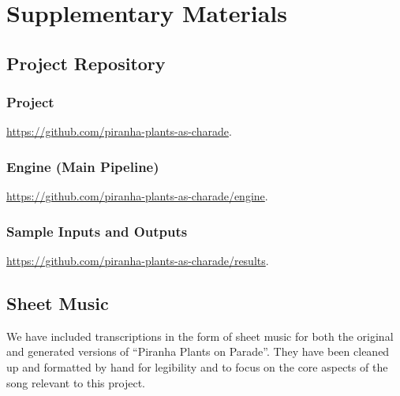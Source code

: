 \section{Supplementary Materials}
\label{sec:supplementary}

\subsection{Project Repository}
\label{sec:code}

\subsubsection{Project} \url{https://github.com/piranha-plants-as-charade}.
\subsubsection{Engine (Main Pipeline)} \url{https://github.com/piranha-plants-as-charade/engine}.
\subsubsection{Sample Inputs and Outputs} \url{https://github.com/piranha-plants-as-charade/results}.

\subsection{Sheet Music}
\label{sec:sheet_music}

We have included transcriptions in the form of sheet music for both the original and generated versions of ``Piranha Plants on Parade''. They have been cleaned up and formatted by hand for legibility and to focus on the core aspects of the song relevant to this project.

\clearpage
